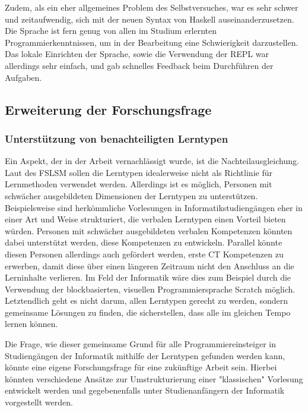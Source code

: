 Zudem, als ein eher allgemeines Problem des Selbstversuches, war es sehr schwer und zeitaufwendig, sich mit der neuen Syntax von Haskell auseinanderzusetzen. Die Sprache ist fern genug von allen im Studium erlernten Programmierkenntnissen, um in der Bearbeitung eine Schwierigkeit darzustellen.
Das lokale Einrichten der Sprache, sowie die Verwendung der REPL war allerdings sehr einfach, und gab schnelles Feedback beim Durchführen der Aufgaben.

\subsection{Erweiterung der Forschungsfrage}\label{sec:future}
\subsubsection{Unterstützung von benachteiligten Lerntypen}
Ein Aspekt, der in der Arbeit vernachlässigt wurde, ist die Nachteilausgleichung. Laut des FSLSM sollen die Lerntypen idealerweise nicht als Richtlinie für Lernmethoden verwendet werden. Allerdings ist es möglich, Personen mit schwächer ausgebildeten Dimensionen der Lerntypen zu unterstützen.
Beispielsweise sind herkömmliche Vorlesungen in Informatikstudiengängen eher in einer Art und Weise strukturiert, die verbalen Lerntypen einen Vorteil bieten würden. Personen mit schwächer ausgebildeten verbalen Kompetenzen könnten dabei unterstützt werden, diese Kompetenzen zu entwickeln. Parallel könnte diesen Personen allerdings auch gefördert werden, erste CT Kompetenzen zu erwerben, damit diese über einen längeren Zeitraum nicht den Anschluss an die Lerninhalte verlieren. Im Feld der Informatik wäre dies zum Beispiel durch die Verwendung der blockbasierten, visuellen Programmiersprache Scratch möglich.
Letztendlich geht es nicht darum, allen Lerntypen gerecht zu werden, sondern gemeinsame Lösungen zu finden, die sicherstellen, dass alle im gleichen Tempo lernen können.

Die Frage, wie dieser gemeinsame Grund für alle Programmiereinsteiger in Studiengängen der Informatik mithilfe der Lerntypen gefunden werden kann, könnte eine eigene Forschungsfrage für eine zukünftige Arbeit sein. Hierbei könnten verschiedene Ansätze zur Umstrukturierung einer "klassischen" Vorlesung entwickelt werden und gegebenenfalls unter Studienanfängern der Informatik vorgestellt werden.

